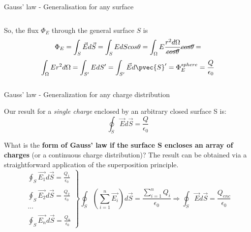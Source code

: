 \begin{frame}{Gauss' law - Generalisation for any surface}
\begin{columns}
\begin{column}{0.66\textwidth}
     So, the flux $\Phi_E$ through the general surface $S$ is
     \begin{equation*}
       \Phi_E = \int_{S} \vec{E} d\vec{S} = \int_{S} E dS cos\theta
          = \int_{\Omega} E \frac{r^{2} d\Omega}{\cancel{cos\theta}} \cancel{cos\theta} =
     \end{equation*}
     \begin{equation*}
        \int_{\Omega} E r^{2} d\Omega = \int_{S^{\prime}} E dS^{\prime}
        = \int_{S^{\prime}} \vec{E} d\pvec{S}' = \Phi_E^{sphere} = \frac{Q}{\epsilon_0}
     \end{equation*}
  \end{column}
\end{columns}
\end{frame}


%
%
%

\begin{frame}{Gauss' law - Generalization for any charge distribution}


Our result for a {\em single charge} enclosed by an arbitrary closed surface S is:
\begin{equation*}
   \oint_{S} \vec{E} d\vec{S} = \frac{Q}{\epsilon_0}
\end{equation*}

What is the {\bf form of Gauss' law if the surface S encloses an array of charges} (or a continuous charge distribution)?
The result can be obtained via a straightforward application of the superposition principle.\\

\begin{equation*}
  \left.
     \begin{array}{l}
      \oint_{S} \vec{E_{1}} d\vec{S} = \frac{Q_{1}}{\epsilon_0}\\
      \\
      \oint_{S} \vec{E_{2}} d\vec{S} = \frac{Q_{2}}{\epsilon_0}\\
      \\
      ...                                                      \\
      \\
      \oint_{S} \vec{E_{n}} d\vec{S} = \frac{Q_{n}}{\epsilon_0}
     \end{array}
  \right\}
  \oint_{S} (\sum_{i=1}^{n}\vec{E_{i}}) d\vec{S} = \frac{\sum_{i=1}^{n}Q_{i}}{\epsilon_0} \Rightarrow
  \oint_{S} \vec{E} d\vec{S} = \frac{Q_{enc}}{\epsilon_0}
\end{equation*}

\end{frame}


